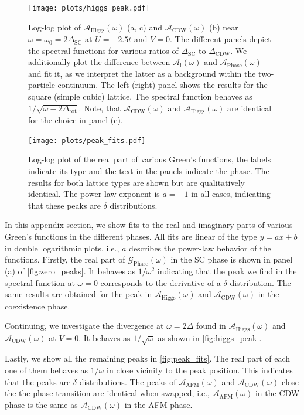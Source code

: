 \documentclass[
    reprint, 
    aps,
    preprintnumbers,
    twocolumn,
    prb,
    superscriptaddress
]{revtex4-2}
\newcommand{\greens}[1]{\mathcal{G}_\text{#1} (\omega)}
\newcommand{\spectral}[1]{\mathcal{A}_\text{#1}  (\omega)}
\begin{document}
\begin{figure}
    \centering
    \texttt{[image: plots/higgs\_peak.pdf]}
    \caption{Log-log plot of $\spectral{Higgs}$ (a, c) and $\spectral{CDW}$ (b) near $\omega = \omega_0 = 2\Delta_\text{SC}$ at $U=-2.5t$ and $V=0$.
    The different panels depict the spectral functions for various ratios of $\Delta_\text{SC}$ to $\Delta_\text{CDW}$.
    We additionally plot the difference between $\spectral{i}$ and $\spectral{Phase}$ and fit it, as we interpret the latter as a background within the two-particle continuum.
    The left (right) panel shows the results for the square (simple cubic) lattice.
    The spectral function behaves as $1 / \sqrt{\omega - 2 \Delta_\text{tot}}$.
    Note, that $\spectral{CDW}$ and $\spectral{Higgs}$ are identical for the choice in panel (c).}
    \label{fig:higgs_peak}
\end{figure}

\begin{figure}
    \centering
    \texttt{[image: plots/peak\_fits.pdf]}
    \caption{Log-log plot of the real part of various Green's functions, the labels indicate its type and the text in the panels indicate the phase.
        The results for both lattice types are shown but are qualitatively identical.
        The power-law exponent is $a=-1$ in all cases, indicating that these peaks are $\delta$ distributions.}
        \label{fig:peak_fits}
\end{figure}

In this appendix section, we show fits to the real and imaginary parts of various Green's functions in the different phases.
All fits are linear of the type $y = ax + b$ in double logarithmic plots, i.e., $a$ describes the power-law behavior of the functions.
Firstly, the real part of $\greens{Phase}$ in the SC phase is shown in panel (a) of \autoref{fig:zero_peaks}.
It behaves as $1/\omega^2$ indicating that the peak we find in the spectral function at $\omega=0$ corresponds to the derivative of a $\delta$ distribution.
The same results are obtained for the peak in $\spectral{Higgs}$ and $\spectral{CDW}$ in the coexistence phase.

Continuing, we investigate the divergence at $\omega = 2\Delta$ found in $\spectral{Higgs}$ and $\spectral{CDW}$ at $V=0$.
It behaves as $1/\sqrt{\omega}$ as shown in \autoref{fig:higgs_peak}.

Lastly, we show all the remaining peaks in \autoref{fig:peak_fits}.
The real part of each one of them behaves as $1/\omega$ in close vicinity to the peak position.
This indicates that the peaks are $\delta$ distributions.
The peaks of $\spectral{AFM}$ and $\spectral{CDW}$ close the the phase transition are identical when swapped, i.e., $\spectral{AFM}$ in the CDW phase is the same as $\spectral{CDW}$ in the AFM phase.
\end{document}
